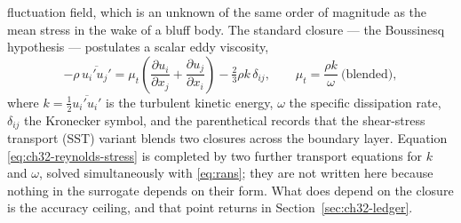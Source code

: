 fluctuation field, which is an unknown of the same order of magnitude as the mean stress in the
wake of a bluff body. The standard closure --- the Boussinesq hypothesis --- postulates a
scalar eddy viscosity,
\begin{equation}
  \label{eq:ch32-reynolds-stress}
  -\rho\, \overline{u_i' u_j'} = \mu_t \left( \frac{\partial u_i}{\partial x_j} + \frac{\partial u_j}{\partial x_i} \right) - \tfrac{2}{3} \rho k\, \delta_{ij},
  \qquad \mu_t = \frac{\rho k}{\omega} \ \text{(blended)},
\end{equation}
where $k = \tfrac{1}{2}\overline{u_i' u_i'}$ is the turbulent kinetic energy, $\omega$ the
specific dissipation rate, $\delta_{ij}$ the Kronecker symbol, and the parenthetical records
that the shear-stress transport (SST) variant blends two closures across the boundary layer.
Equation \eqref{eq:ch32-reynolds-stress} is completed by two further transport equations for
$k$ and $\omega$, solved simultaneously with \eqref{eq:rans}; they are not written here because
nothing in the surrogate depends on their form. What does depend on the closure is the accuracy
ceiling, and that point returns in Section~\ref{sec:ch32-ledger}.

